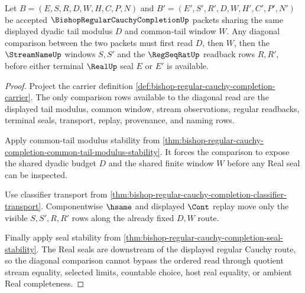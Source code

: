 \begin{theorem}
\label{thm:bishop-regular-cauchy-completion-diagonal-window-stability}
Let $B=(E,S,R,D,W,H,C,P,N)$ and $B'=(E',S',R',D,W,H',C',P',N')$ be accepted $\BishopRegularCauchyCompletionUp$ packets sharing the same displayed dyadic tail modulus $D$ and common-tail window $W$. Any diagonal comparison between the two packets must first read $D$, then $W$, then the $\StreamNameUp$ windows $S,S'$ and the $\RegSeqRatUp$ readback rows $R,R'$, before either terminal $\RealUp$ seal $E$ or $E'$ is available.
\end{theorem}
\begin{proof}
Project the carrier definition \autoref{def:bishop-regular-cauchy-completion-carrier}. The only comparison rows available to the diagonal read are the displayed tail modulus, common window, stream observations, regular readbacks, terminal seals, transport, replay, provenance, and naming rows.

Apply common-tail modulus stability from \autoref{thm:bishop-regular-cauchy-completion-common-tail-modulus-stability}. It forces the comparison to expose the shared dyadic budget $D$ and the shared finite window $W$ before any Real seal can be inspected.

Use classifier transport from \autoref{thm:bishop-regular-cauchy-completion-classifier-transport}. Componentwise $\hsame$ and displayed $\Cont$ replay move only the visible $S,S',R,R'$ rows along the already fixed $D,W$ route.

Finally apply seal stability from \autoref{thm:bishop-regular-cauchy-completion-seal-stability}. The Real seals are downstream of the displayed regular Cauchy route, so the diagonal comparison cannot bypass the ordered read through quotient stream equality, selected limits, countable choice, host real equality, or ambient Real completeness.
\end{proof}


